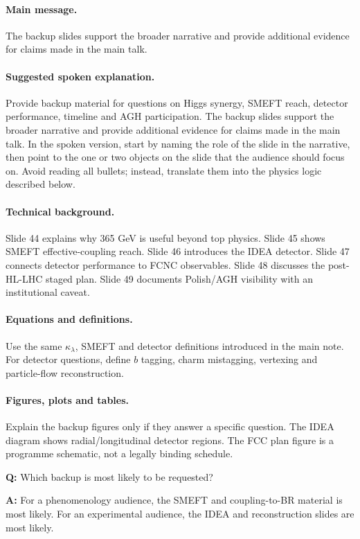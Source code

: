 \documentclass[11pt,a4paper]{report}
\begin{document}
\paragraph{Main message.}
The backup slides support the broader narrative and provide additional evidence for claims made in the main talk.

\paragraph{Suggested spoken explanation.}
Provide backup material for questions on Higgs synergy, SMEFT reach, detector performance, timeline and AGH participation. The backup slides support the broader narrative and provide additional evidence for claims made in the main talk. In the spoken version, start by naming the role of the slide in the narrative, then point to the one or two objects on the slide that the audience should focus on.  Avoid reading all bullets; instead, translate them into the physics logic described below.

\paragraph{Technical background.}
Slide 44 explains why 365 GeV is useful beyond top physics.  Slide 45 shows SMEFT effective-coupling reach.  Slide 46 introduces the IDEA detector.  Slide 47 connects detector performance to FCNC observables.  Slide 48 discusses the post-HL-LHC staged plan.  Slide 49 documents Polish/AGH visibility with an institutional caveat.

\paragraph{Equations and definitions.}
Use the same $\kappa_\lambda$, SMEFT and detector definitions introduced in the main note.  For detector questions, define $b$ tagging, charm mistagging, vertexing and particle-flow reconstruction.

\paragraph{Figures, plots and tables.}
Explain the backup figures only if they answer a specific question.  The IDEA diagram shows radial/longitudinal detector regions.  The FCC plan figure is a programme schematic, not a legally binding schedule.

\begin{questionbox}
\textbf{Q:} Which backup is most likely to be requested?\par
\textbf{A:} For a phenomenology audience, the SMEFT and coupling-to-BR material is most likely.  For an experimental audience, the IDEA and reconstruction slides are most likely.
\end{questionbox}
\end{document}
